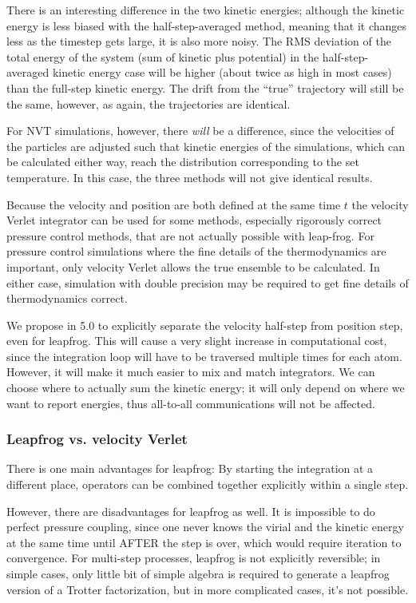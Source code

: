 \documentclass[11pt,a4paper,twoside]{article}
\begin{document}
There is an interesting difference in the two kinetic energies;
although the kinetic energy is less biased with the half-step-averaged
method, meaning that it changes less as the timestep gets large, it is
also more noisy.  The RMS deviation of the total energy of the system
(sum of kinetic plus potential) in the half-step-averaged kinetic
energy case will be higher (about twice as high in most cases) than
the full-step kinetic energy.  The drift from the ``true'' trajectory
will still be the same, however, as again, the trajectories are
identical.

For NVT simulations, however, there {\em will} be a difference, since
the velocities of the particles are adjusted such that kinetic
energies of the simulations, which can be calculated either way, reach
the distribution corresponding to the set temperature.  In this case,
the three methods will not give identical results.

Because the velocity and position are both defined at the same time
$t$ the velocity Verlet integrator can be used for some methods,
especially rigorously correct pressure control methods, that are not
actually possible with leap-frog.  For pressure control simulations
where the fine details of the thermodynamics are important, only
velocity Verlet allows the true ensemble to be calculated.  In either
case, simulation with double precision may be required to get fine
details of thermodynamics correct.

We propose in 5.0 to explicitly separate the velocity half-step from
position step, even for leapfrog. This will cause a very slight
increase in computational cost, since the integration loop will have
to be traversed multiple times for each atom.  However, it will make
it much easier to mix and match integrators.  We can choose where to
actually sum the kinetic energy; it will only depend on where we want
to report energies, thus all-to-all communications will not be
affected.

\subsubsection{Leapfrog vs. velocity Verlet}

There is one main advantages for leapfrog: By starting the integration
at a different place, operators can be combined together explicitly
within a single step.

However, there are disadvantages for leapfrog as well.  It is
impossible to do perfect pressure coupling, since one never knows the
virial and the kinetic energy at the same time until AFTER the step is
over, which would require iteration to convergence.  For multi-step
processes, leapfrog is not explicitly reversible; in simple cases,
only little bit of simple algebra is required to generate a leapfrog
version of a Trotter factorization, but in more complicated cases,
it's not possible.
\end{document}
